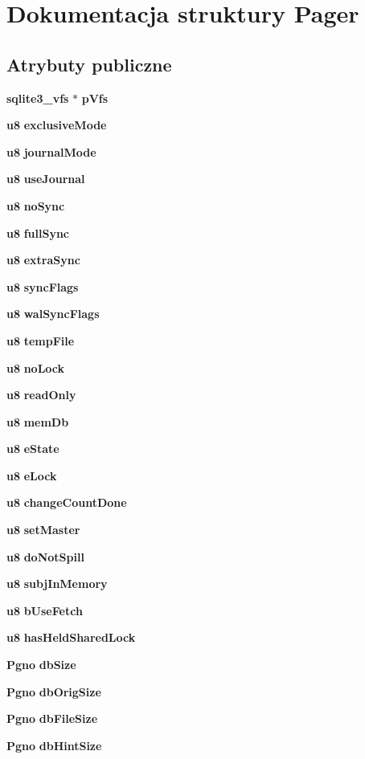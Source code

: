 \section{Dokumentacja struktury Pager}
\label{struct_pager}
\subsection*{Atrybuty publiczne}
\begin{DoxyCompactItemize}
\item 
\textbf{ sqlite3\+\_\+vfs} $\ast$ \textbf{ p\+Vfs}
\item 
\textbf{ u8} \textbf{ exclusive\+Mode}
\item 
\textbf{ u8} \textbf{ journal\+Mode}
\item 
\textbf{ u8} \textbf{ use\+Journal}
\item 
\textbf{ u8} \textbf{ no\+Sync}
\item 
\textbf{ u8} \textbf{ full\+Sync}
\item 
\textbf{ u8} \textbf{ extra\+Sync}
\item 
\textbf{ u8} \textbf{ sync\+Flags}
\item 
\textbf{ u8} \textbf{ wal\+Sync\+Flags}
\item 
\textbf{ u8} \textbf{ temp\+File}
\item 
\textbf{ u8} \textbf{ no\+Lock}
\item 
\textbf{ u8} \textbf{ read\+Only}
\item 
\textbf{ u8} \textbf{ mem\+Db}
\item 
\textbf{ u8} \textbf{ e\+State}
\item 
\textbf{ u8} \textbf{ e\+Lock}
\item 
\textbf{ u8} \textbf{ change\+Count\+Done}
\item 
\textbf{ u8} \textbf{ set\+Master}
\item 
\textbf{ u8} \textbf{ do\+Not\+Spill}
\item 
\textbf{ u8} \textbf{ subj\+In\+Memory}
\item 
\textbf{ u8} \textbf{ b\+Use\+Fetch}
\item 
\textbf{ u8} \textbf{ has\+Held\+Shared\+Lock}
\item 
\textbf{ Pgno} \textbf{ db\+Size}
\item 
\textbf{ Pgno} \textbf{ db\+Orig\+Size}
\item 
\textbf{ Pgno} \textbf{ db\+File\+Size}
\item 
\textbf{ Pgno} \textbf{ db\+Hint\+Size}

\end{DoxyCompactItemize}
